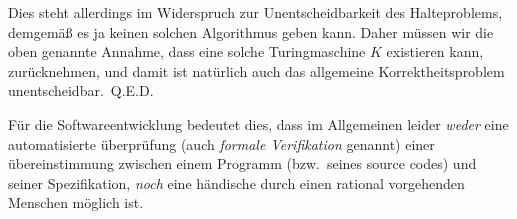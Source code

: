 Dies steht allerdings im Widerspruch zur Unentscheidbarkeit des Halteproblems, demge\-mäß es ja keinen solchen Algorithmus geben kann. Daher müssen wir die oben genannte Annahme, dass eine solche Turingmaschine $K$ existieren kann, zurücknehmen, und damit ist natürlich auch das allgemeine Korrektheitsproblem unentscheidbar.~Q.E.D.\newline

\noindent Für die Softwareentwicklung bedeutet dies, dass im Allgemeinen leider \emph{weder} eine automatisierte überprüfung (auch \emph{formale Verifikation} genannt) einer übereinstimmung zwischen einem Programm (bzw.\ seines source codes) und seiner Spezifikation, \emph{noch} eine händische durch einen rational vorgehenden Menschen möglich ist.
